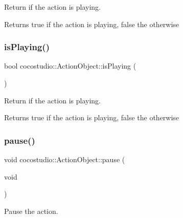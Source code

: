 Return if the action is playing.

\begin{DoxyReturn}{Returns}
true if the action is playing, false the otherwise 
\end{DoxyReturn}
\mbox{\label{classcocostudio_1_1ActionObject_ab3a5940502a32dbd778990dc1a47389a}} 
\subsubsection{\texorpdfstring{is\+Playing()}{isPlaying()}\hspace{0.1cm}{\footnotesize\ttfamily [2/2]}}
{\footnotesize\ttfamily bool cocostudio\+::\+Action\+Object\+::is\+Playing (\begin{DoxyParamCaption}{ }\end{DoxyParamCaption})}

Return if the action is playing.

\begin{DoxyReturn}{Returns}
true if the action is playing, false the otherwise 
\end{DoxyReturn}
\mbox{\label{classcocostudio_1_1ActionObject_a96d9dcb811d26e9c3ca729f9ec51f18a}} 
\subsubsection{\texorpdfstring{pause()}{pause()}\hspace{0.1cm}{\footnotesize\ttfamily [1/2]}}
{\footnotesize\ttfamily void cocostudio\+::\+Action\+Object\+::pause (\begin{DoxyParamCaption}\item[{void}]{ }\end{DoxyParamCaption})}

Pause the action. \mbox{\label{classcocostudio_1_1ActionObject_a96d9dcb811d26e9c3ca729f9ec51f18a}} 
